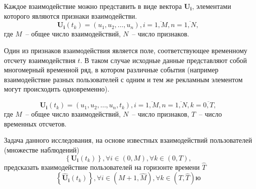 Каждое взаимодействие можно представить в виде вектора $\mathbf{U_i}$, элементами которого являются признаки
взаимодействи.
\begin{equation}
    \mathbf{U_i}\left(t_k\right) =
    \left( u_1, u_2, \dots, u_n \right),
    i = \overline{1, M}, n = \overline{1, N},
\end{equation} где $M$~-- общее число взаимодействий, $N$~-- число признаков.

Один из признаков взаимодействия является поле, соответствующее временному отсчету взаимодействия $t$. В таком случае
исходные данные представляют собой многомерный временной ряд, в котором различные события (например взаимодействие
разных пользователей с одним и тем же рекламным элементом могут происходить одновременно).

\begin{equation}
    \mathbf{U_i}\left(t_k\right) =
    \left( u_1, u_2, \dots, u_n, t_k \right),
    i = \overline{1, M}, n = \overline{1, N}, k = \overline{0, T},
\end{equation} где $M$~-- общее число взаимодействий, $N$~-- число признаков, $T$~-- число временных отсчетов.

Задача данного исследования, на основе известных взаимодействий пользователей (множестве наблюдений)
\begin{equation}
    \left\{ \mathbf{U_i}\left(t_k\right)\right\},
    \forall i \in \left( 0, M \right), \forall k \in \left(0, T\right),
\end{equation}
предсказать взаимодействие пользователей на горизонте времени $\widehat{T}$
\begin{equation}
    \left\{\mathbf{\widehat{U}_i}\left(t_k\right)\right\},
    \forall i \in \left( M + 1, \widehat{M} \right), \forall k \in \left(T, \widehat{T}\right)ю
\end{equation}